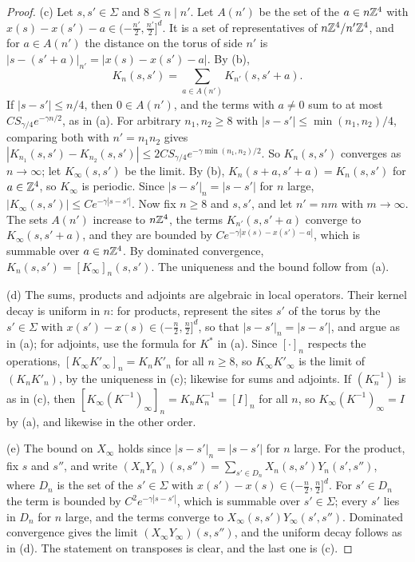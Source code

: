 \begin{proof}
(c) Let $s,s'\in\Sigma$ and $8\le n\mid n'$. Let $A(n')$ be the set of the $a\in n\mathbb Z^4$ with $x(s)-x(s')-a\in(-\frac{n'}2,\frac{n'}2]^d$. It is a set of representatives of $n\mathbb Z^4/n'\mathbb Z^4$, and for $a\in A(n')$ the distance on the torus of side $n'$ is $|s-(s'+a)|_{n'}=|x(s)-x(s')-a|$. By (b),
\[
K_n(s,s')=\sum_{a\in A(n')}K_{n'}(s,s'+a).
\]
If $|s-s'|\le n/4$, then $0\in A(n')$, and the terms with $a\ne0$ sum to at most $CS_{\gamma/4}e^{-\gamma n/2}$, as in (a). For arbitrary $n_1,n_2\ge8$ with $|s-s'|\le\min(n_1,n_2)/4$, comparing both with $n'=n_1n_2$ gives $|K_{n_1}(s,s')-K_{n_2}(s,s')|\le2CS_{\gamma/4}e^{-\gamma\min(n_1,n_2)/2}$. So $K_n(s,s')$ converges as $n\to\infty$; let $K_\infty(s,s')$ be the limit. By (b), $K_n(s+a,s'+a)=K_n(s,s')$ for $a\in\mathbb Z^4$, so $K_\infty$ is periodic. Since $|s-s'|_n=|s-s'|$ for $n$ large, $|K_\infty(s,s')|\le Ce^{-\gamma|s-s'|}$. Now fix $n\ge8$ and $s,s'$, and let $n'=nm$ with $m\to\infty$. The sets $A(n')$ increase to $n\mathbb Z^4$, the terms $K_{n'}(s,s'+a)$ converge to $K_\infty(s,s'+a)$, and they are bounded by $Ce^{-\gamma|x(s)-x(s')-a|}$, which is summable over $a\in n\mathbb Z^4$. By dominated convergence, $K_n(s,s')=[K_\infty]_n(s,s')$. The uniqueness and the bound follow from (a).

(d) The sums, products and adjoints are algebraic in local operators. Their kernel decay is uniform in $n$: for products, represent the sites $s'$ of the torus by the $s'\in\Sigma$ with $x(s')-x(s)\in(-\frac n2,\frac n2]^d$, so that $|s-s'|_n=|s-s'|$, and argue as in (a); for adjoints, use the formula for $K^*$ in (a). Since $[\cdot]_n$ respects the operations, $[K_\infty K'_\infty]_n=K_nK'_n$ for all $n\ge8$, so $K_\infty K'_\infty$ is the limit of $(K_nK'_n)$, by the uniqueness in (c); likewise for sums and adjoints. If $(K_n^{-1})$ is as in (c), then $[K_\infty(K^{-1})_\infty]_n=K_nK_n^{-1}=[I]_n$ for all $n$, so $K_\infty(K^{-1})_\infty=I$ by (a), and likewise in the other order.

(e) The bound on $X_\infty$ holds since $|s-s'|_n=|s-s'|$ for $n$ large. For the product, fix $s$ and $s''$, and write $(X_nY_n)(s,s'')=\sum_{s'\in D_n}X_n(s,s')Y_n(s',s'')$, where $D_n$ is the set of the $s'\in\Sigma$ with $x(s')-x(s)\in(-\frac n2,\frac n2]^d$. For $s'\in D_n$ the term is bounded by $C^2e^{-\gamma|s-s'|}$, which is summable over $s'\in\Sigma$; every $s'$ lies in $D_n$ for $n$ large, and the terms converge to $X_\infty(s,s')Y_\infty(s',s'')$. Dominated convergence gives the limit $(X_\infty Y_\infty)(s,s'')$, and the uniform decay follows as in (d). The statement on transposes is clear, and the last one is (c).
\end{proof}

